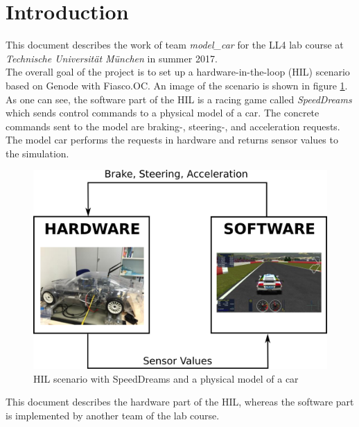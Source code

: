 \section{Introduction}
\label{sec:intro}
This document describes the work of team \textit{model\_car} for the LL4 lab course at \textit{Technische Universität München} in summer 2017. \\

The overall goal of the project is to set up a hardware-in-the-loop (HIL) scenario based on Genode with Fiasco.OC. An image of the scenario is shown in figure \ref{fig:hil}. As one can see, the software part of the HIL is a racing game called \textit{SpeedDreams} which sends control commands to a physical model of a car. The concrete commands sent to the model are braking-, steering-, and acceleration requests. The model car performs the requests in hardware and returns sensor values to the simulation. \\

\begin{figure}[h]
    \centering
    \includegraphics[width=0.7\linewidth]{images/hil}
    \caption{HIL scenario with SpeedDreams and a physical model of a car}
    \label{fig:hil}
\end{figure}

This document describes the hardware part of the HIL, whereas the software part is implemented by another team of the lab course.
